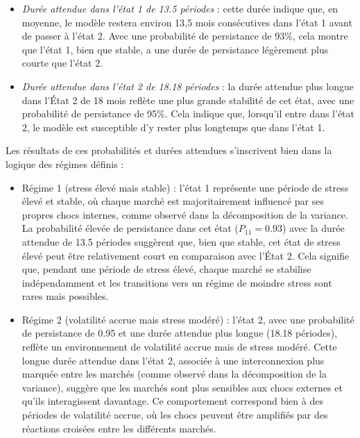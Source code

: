 \vspace{0.5cm}

\begin{itemize}
    \item \textit{Durée attendue dans l'état 1 de 13.5 périodes} : cette durée indique que, en moyenne, le modèle restera environ 13,5 mois consécutives dans l'état 1 avant de passer à l'état 2. Avec une probabilité de persistance de 93\%, cela montre que l'état 1, bien que stable, a une durée de persistance légèrement plus courte que l'état 2.
    \item \textit{Durée attendue dans l'état 2 de 18.18 périodes} : la durée attendue plus longue dans l'État 2 de 18 mois reflète une plus grande stabilité de cet état, avec une probabilité de persistance de 95\%. Cela indique que, lorsqu’il entre dans l’état 2, le modèle est susceptible d’y rester plus longtemps que dans l’état 1.
\end{itemize}

\vspace{0.5cm}

Les résultats de ces probabilités et durées attendues s'inscrivent bien dans la logique des régimes définis :

\begin{itemize}
    \item Régime 1 (stress élevé mais stable) : l'état 1 représente une période de stress élevé et stable, où chaque marché est majoritairement influencé par ses propres chocs internes, comme observé dans la décomposition de la variance. La probabilité élevée de persistance dans cet état (\( P_{11} = 0.93 \)) avec la durée attendue de 13.5 périodes suggèrent que, bien que stable, cet état de stress élevé peut être relativement court en comparaison avec l'État 2. Cela signifie que, pendant une période de stress élevé, chaque marché se stabilise indépendamment et les transitions vers un régime de moindre stress sont rares mais possibles.
    \item Régime 2 (volatilité accrue mais stress modéré) : l'état 2, avec une probabilité de persistance de 0.95 et une durée attendue plus longue (18.18 périodes), reflète un environnement de volatilité accrue mais de stress modéré. Cette longue durée attendue dans l'état 2, associée à une interconnexion plus marquée entre les marchés (comme observé dans la décomposition de la variance), suggère que les marchés sont plus sensibles aux chocs externes et qu’ils interagissent davantage. Ce comportement correspond bien à des périodes de volatilité accrue, où les chocs peuvent être amplifiés par des réactions croisées entre les différents marchés.
\end{itemize}


